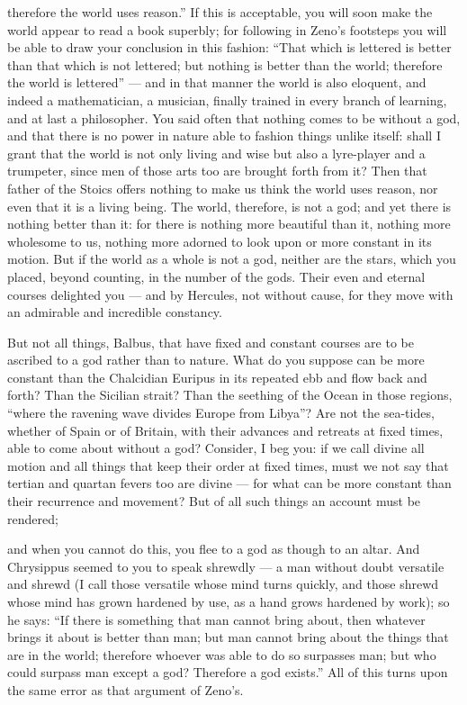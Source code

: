  therefore the world uses reason.'' If this is acceptable, you will soon make the world appear to read a book superbly; for following in Zeno's footsteps you will be able to draw your conclusion in this fashion: ``That which is lettered is better than that which is not lettered; but nothing is better than the world; therefore the world is lettered'' — and in that manner the world is also eloquent, and indeed a mathematician, a musician, finally trained in every branch of learning, and at last a philosopher. You said often that nothing comes to be without a god, and that there is no power in nature able to fashion things unlike itself: shall I grant that the world is not only living and wise but also a lyre-player and a trumpeter, since men of those arts too are brought forth from it? Then that father of the Stoics offers nothing to make us think the world uses reason, nor even that it is a living being. The world, therefore, is not a god; and yet there is nothing better than it: for there is nothing more beautiful than it, nothing more wholesome to us, nothing more adorned to look upon or more constant in its motion. But if the world as a whole is not a god, neither are the stars, which you placed, beyond counting, in the number of the gods. Their even and eternal courses delighted you — and by Hercules, not without cause, for they move with an admirable and incredible constancy.

 But not all things, Balbus, that have fixed and constant courses are to be ascribed to a god rather than to nature. What do you suppose can be more constant than the Chalcidian Euripus in its repeated ebb and flow back and forth? Than the Sicilian strait? Than the seething of the Ocean in those regions, ``where the ravening wave divides Europe from Libya''? Are not the sea-tides, whether of Spain or of Britain, with their advances and retreats at fixed times, able to come about without a god? Consider, I beg you: if we call divine all motion and all things that keep their order at fixed times, must we not say that tertian and quartan fevers too are divine — for what can be more constant than their recurrence and movement? But of all such things an account must be rendered;

 and when you cannot do this, you flee to a god as though to an altar. And Chrysippus seemed to you to speak shrewdly — a man without doubt versatile and shrewd (I call those versatile whose mind turns quickly, and those shrewd whose mind has grown hardened by use, as a hand grows hardened by work); so he says: ``If there is something that man cannot bring about, then whatever brings it about is better than man; but man cannot bring about the things that are in the world; therefore whoever was able to do so surpasses man; but who could surpass man except a god? Therefore a god exists.'' All of this turns upon the same error as that argument of Zeno's.

